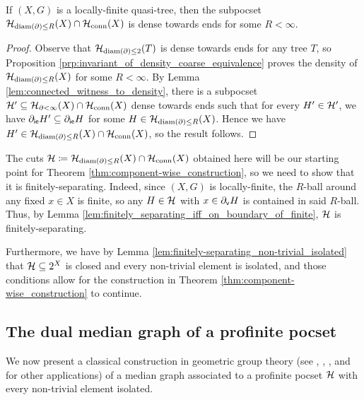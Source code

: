 \documentclass[reqno]{amsart}
\begin{document}
    \begin{corollary}\label{cor:density_of_bounded_diameter_boundary_cuts_quasi_tree}
        If $(X,G)$ is a locally-finite quasi-tree, then the subpocset $\mathcal{H}_{\operatorname{diam}(\partial)\leq R}(X)\cap\mathcal{H}_\mathrm{conn}(X)$ is dense towards ends for some $R<\infty$.
    \end{corollary}
    \begin{proof}
        Observe that $\mathcal{H}_{\operatorname{diam}(\partial)\leq2}(T)$ is dense towards ends for any tree $T$, so Proposition \ref{prp:invariant_of_density_coarse_equivalence} proves the density of $\mathcal{H}_{\operatorname{diam}(\partial)\leq R}(X)$ for some $R<\infty$. By Lemma \ref{lem:connected_witness_to_density}, there is a subpocset $\mathcal{H}'\subseteq\mathcal{H}_{\partial<\infty}(X)\cap\mathcal{H}_\mathrm{conn}(X)$ dense towards ends such that for every $H'\in\mathcal{H}'$, we have $\partial_\mathsf{ie}H'\subseteq\partial_\mathsf{ie}H$ for some $H\in\mathcal{H}_{\operatorname{diam}(\partial)\leq R}(X)$. Hence we have $H'\in\mathcal{H}_{\operatorname{diam}(\partial)\leq R}(X)\cap\mathcal{H}_\mathrm{conn}(X)$, so the result follows.
    \end{proof}

    The cuts $\mathcal{H}\coloneqq\mathcal{H}_{\operatorname{diam}(\partial)\leq R}(X)\cap\mathcal{H}_\mathrm{conn}(X)$ obtained here will be our starting point for Theorem \ref{thm:component-wise_construction}, so we need to show that it is finitely-separating. Indeed, since $(X,G)$ is locally-finite, the $R$-ball around any fixed $x\in X$ is finite, so any $H\in\mathcal{H}$ with $x\in\partial_\mathsf{v}H$ is contained in said $R$-ball. Thus, by Lemma \ref{lem:finitely_separating_iff_on_boundary_of_finite}, $\mathcal{H}$ is finitely-separating.

    Furthermore, we have by Lemma \ref{lem:finitely-separating_non-trivial_isolated} that $\mathcal{H}\subseteq2^X$ is closed and every non-trivial element is isolated, and those conditions allow for the construction in Theorem \ref{thm:component-wise_construction} to continue.

    \subsection{The dual median graph of a profinite pocset}\label{sec:the_dual_median_graph_of_a_pocset}

    We now present a classical construction in geometric group theory (see \cite{Dun79}, \cite{Rol98}, \cite{Sag95}, and \cite{NR03} for other applications) of a median graph associated to a profinite pocset $\mathcal{H}$ with every non-trivial element isolated.
\end{document}

